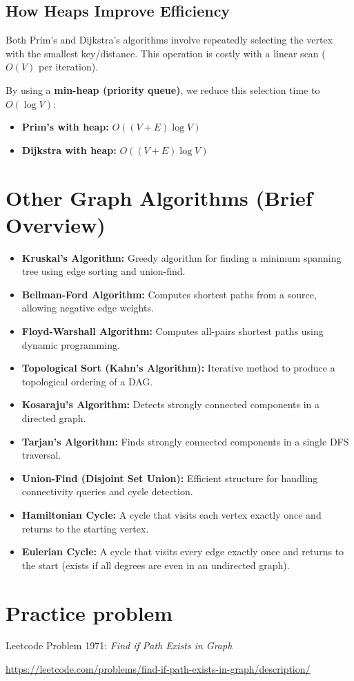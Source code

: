 \documentclass{article}
\begin{document}
\subsection{How Heaps Improve Efficiency}

Both Prim’s and Dijkstra’s algorithms involve repeatedly selecting the vertex with the smallest key/distance. This operation is costly with a linear scan ($O(V)$ per iteration).

By using a \textbf{min-heap (priority queue)}, we reduce this selection time to $O(\log V)$:
\begin{itemize}
    \item \textbf{Prim's with heap:} $O((V + E) \log V)$
    \item \textbf{Dijkstra with heap:} $O((V + E) \log V)$
\end{itemize}

\section{Other Graph Algorithms (Brief Overview)}

\begin{itemize}
    \item \textbf{Kruskal’s Algorithm:} Greedy algorithm for finding a minimum spanning tree using edge sorting and union-find.
    \item \textbf{Bellman-Ford Algorithm:} Computes shortest paths from a source, allowing negative edge weights.
    \item \textbf{Floyd-Warshall Algorithm:} Computes all-pairs shortest paths using dynamic programming.
    \item \textbf{Topological Sort (Kahn’s Algorithm):} Iterative method to produce a topological ordering of a DAG.
    \item \textbf{Kosaraju’s Algorithm:} Detects strongly connected components in a directed graph.
    \item \textbf{Tarjan’s Algorithm:} Finds strongly connected components in a single DFS traversal.
    \item \textbf{Union-Find (Disjoint Set Union):} Efficient structure for handling connectivity queries and cycle detection.
    \item \textbf{Hamiltonian Cycle:} A cycle that visits each vertex exactly once and returns to the starting vertex.
    \item \textbf{Eulerian Cycle:} A cycle that visits every edge exactly once and returns to the start (exists if all degrees are even in an undirected graph).
\end{itemize}

\section{Practice problem}
Leetcode Problem 1971: \textit{Find if Path Exists in Graph}

\url{https://leetcode.com/problems/find-if-path-exists-in-graph/description/}
\end{document}
